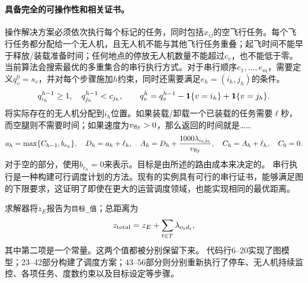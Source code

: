 \documentclass[11pt]{article}
\begin{document}
\paragraph{具备完全的可操作性和相关证书。}
操作解决方案必须依次执行每个标记的任务，同时包括$x_{ij}$的空飞行任务。每个飞行任务都分配给一个无人机，且无人机不能与其他飞行任务重叠；起飞时间不能早于释放/装载准备时间；任何地点的停放无人机数量不能超过$c_v$，也不能低于零。当前算法会搜索最优的多重集合的串行执行方式。对于串行顺序$e_1,\ldots,e_m$，需要定义$q_v^0=s_v$，并对每个步骤施加$h$约束，同时还需要满足$e_h=(i_h,j_h)$的条件。
\[
q_{i_h}^{h-1}\ge1,\quad q_{j_h}^{h-1}<c_{j_h},\qquad
q_v^h=q_v^{h-1}-{\bf1}\{v=i_h\}+{\bf1}\{v=j_h\}.
\]
将实际存在的无人机分配到$i_h$位置。如果装载/卸载一个已装载的任务需要$\ell$秒，而空腿则不需要时间；如果速度为$v_{\rm fly}>0$，那么返回的时间就是……
\[
a_h=\max\{C_{h-1},b_{e_h}\},\quad
D_h=a_h+\ell_h,\quad
A_h=D_h+\frac{1000\lambda_{i_hj_h}}{v_{\rm fly}},\quad
C_h=A_h+\ell_h,\quad C_0=0.
\]
对于空的部分，使用$b_{e_h}=0$来表示。目标是由所述的路由成本来决定的。  
串行执行是一种构建可行调度计划的方法。现有的实例具有可行的串行证书，能够满足图的下限要求，这证明了即使在更大的运营调度领域，也能实现相同的最优距离。

求解器将$z_E$报告为\texttt{目标\_值}；总距离为
\[
z_{\rm total}=z_E+\sum_{t\in T}\lambda_{o_td_t},
\]
其中第二项是一个常量。这两个值都被分别保留下来。  
代码行6–20实现了图模型；23–42部分构建了调度方案；43–56部分则分别重新执行了停车、无人机持续监控、各项任务、度数约束以及目标设定等步骤。
\end{document}
